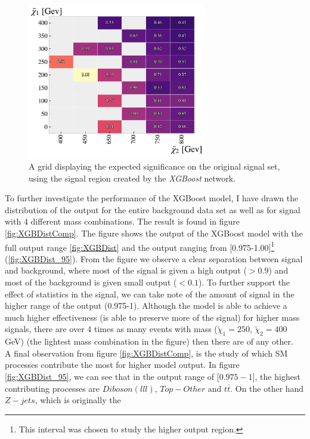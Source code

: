 \begin{figure}
    \centering
    \includegraphics[width=0.7\textwidth]{Figures/MLResults/XGB/SUSY/Grid/XGBGridSig.pdf}
    \caption{A grid displaying the expected significance on the original signal set, using the signal region 
    created by the \emph{XGBoost} network.}
    \label{fig:XGBoost}
\end{figure}
To further investigate the performance of the XGBoost model, I have drawn the distribution of the output for the 
entire background data set as well as for signal with 4 different mass combinations. The result is found in figure 
\ref{fig:XGBDistComp}. The figure shows the output of the XGBoost model with the full output range \ref{fig:XGBDist}
and the output ranging from [0.975-1.00]\footnote{This interval was chosen to study the higher output region.} (\ref{fig:XGBDist_95}). 
From the figure we observe a clear separation between 
signal and background, where most of the signal is given a high output ($>0.9$) and most of the background is given small
output ($<0.1$). To further support the effect of statistics in the signal, we can take note of the 
amount of signal in the higher range of the output (0.975-1). Although the model is able to achieve a much higher 
effectiveness (is able to preserve more of the signal) for higher mass signals, there are over 4 times as many 
events with mass ($\tilde{\chi}_1=250$, $\tilde{\chi}_2=400$GeV) (the lightest mass combination in the figure) then there 
are of any other.
\\
A final observation from figure \ref{fig:XGBDistComp}, is the study of which \ac{SM} processes contribute the most 
for higher model output. In figure \ref{fig:XGBDist_95}, we can see that in the output range of [$0.975-1$], the highest 
contributing processes are $Diboson(lll)$, $Top-Other$ and $t\bar{t}$. On the other hand $Z-jets$, which is originally the 
